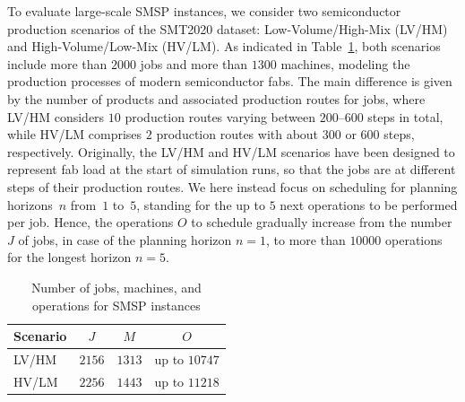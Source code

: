To evaluate large-scale SMSP instances,
we consider two semiconductor production scenarios of the SMT2020 dataset:
Low-Volume/High-Mix (LV/HM) and High-Volume/Low-Mix (HV/LM).
As indicated in Table~\ref{tab:Dataset},
both scenarios include more than $2000$ jobs and more than $1300$ machines,
modeling the production processes of modern semiconductor fabs.
The main difference is given by the number of products and associated production routes for jobs, where LV/HM considers $10$ production routes varying between
$200$--$600$ steps in total, while HV/LM comprises $2$ production routes with about
$300$ or $600$ steps, respectively.
Originally, the LV/HM and HV/LM scenarios have been designed to represent fab load at the
start of simulation runs, so that the jobs are at different steps of their
production routes.
We here instead focus on scheduling for planning horizons~$n$ from~$1$ to~$5$,
standing for the up to $5$ next operations to be performed per job.
Hence, the operations $O$ to schedule gradually increase from the
number $J$ of jobs, in case of the planning horizon $n=1$,
to more than $10000$ operations %
for the longest %
horizon $n=5$.

\begin{table}[t]
	\caption{Number of jobs, machines, and operations for SMSP instances}\label{tab:Dataset} \centering
	\begin{tabular}{|l|c|c|c|}
		\hline
		Scenario & $J$    & $M$    & $O$              \\ \hline
		LV/HM    & $2156$ & $1313$ & up to $10747$    \\ 
		HV/LM    & $2256$ & $1443$ & up to $11218$    \\
		\hline
	\end{tabular}
\end{table}
%

